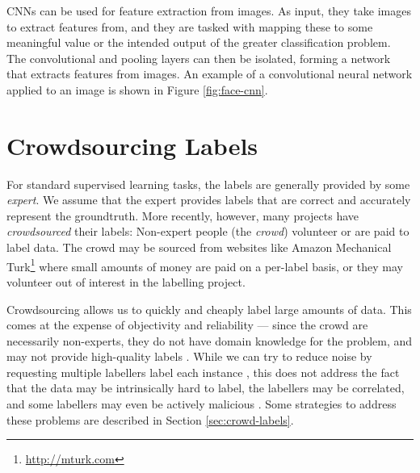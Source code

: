         CNNs can be used for feature extraction from images. As input, they
        take images to extract features from, and they are tasked with mapping
        these to some meaningful value or the intended output of the greater
        classification problem. The convolutional and pooling layers can then
        be isolated, forming a network that extracts features from images. An
        example of a convolutional neural network applied to an image is shown
        in Figure \ref{fig:face-cnn}.

\section{Crowdsourcing Labels}
\label{sec:crowdsourcing}

    For standard supervised learning tasks, the labels are generally provided by
    some \emph{expert}. We assume that the expert provides labels that are
    correct and accurately represent the groundtruth. More recently, however,
    many projects have \emph{crowdsourced} their labels: Non-expert people (the
    \emph{crowd}) volunteer or are paid to label data. The crowd may be sourced
    from websites like Amazon Mechanical Turk\footnote{\url{http://mturk.com}}
    where small amounts of money are paid on a per-label basis, or they may
    volunteer out of interest in the labelling project.

    Crowdsourcing allows us to quickly and cheaply label large amounts of data.
    This comes at the expense of objectivity and reliability --- since the crowd
    are necessarily non-experts, they do not have domain knowledge for the
    problem, and may not provide high-quality labels \citep{raykar10}. While we
    can try to reduce noise by requesting multiple labellers label each instance
    \citep{lin16, sheng08}, this does not address the fact that the data may be
    intrinsically hard to label, the labellers may be correlated, and some
    labellers may even be actively malicious \citep{yan10}. Some strategies to
    address these problems are described in Section \ref{sec:crowd-labels}.


